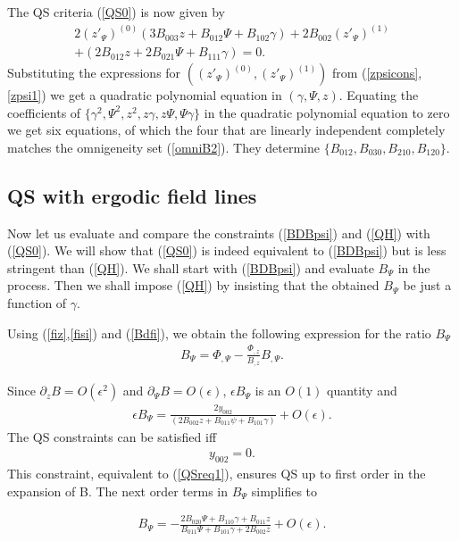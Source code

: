 \documentclass[aip,pop,reprint]{revtex4-1}
\newcommand*{\ep}{\epsilon}
\begin{document}
The QS criteria (\ref{QS0}) is now given by
\begin{align}
2(z'_\Psi)^{(0)}(3 B_{003}z+B_{012}\Psi + B_{102}\gamma)+2B_{002}(z'_\Psi)^{(1)}\nonumber\\
+(2 B_{012}z +2B_{021}\Psi +B_{111}\gamma)=0.
\end{align}
Substituting the expressions for $((z'_\Psi)^{(0)},(z'_\Psi)^{(1)})$ from (\ref{zpsicons},\ref{zpsi1}) we get a quadratic polynomial equation in $(\gamma,\Psi,z)$. Equating the coefficients of $\{\gamma^2,\Psi^2,z^2,z\gamma,z\Psi,\Psi\gamma\}$ in the quadratic polynomial equation to zero we get six equations, of which the four that are linearly independent completely matches the omnigeneity set (\ref{omniB2}). They determine $\{B_{012},B_{030},B_{210},B_{120}\}$.

\subsection{QS with ergodic field lines}
Now let us evaluate and compare the constraints (\ref{BDBpsi}) and (\ref{QH}) with (\ref{QS0}). We will show that (\ref{QS0}) is indeed equivalent to (\ref{BDBpsi}) but is less stringent than (\ref{QH}). We shall start with (\ref{BDBpsi}) and evaluate $B_\Psi$ in the process. Then we shall impose (\ref{QH}) by insisting that the obtained $B_\Psi$ be just a function of $\gamma$. 

Using (\ref{fiz},\ref{fisi}) and (\ref{Bdfi}), we obtain the following expression for the ratio $B_\Psi$
\begin{align}
B_\Psi= \Phi_{,\Psi}-\frac{\Phi_{,z}}{B_{,z}} B_{,\Psi}. \label{hdef}
\end{align}

Since $\partial_z B =O(\epsilon^2)$ and $\partial_\Psi B= O(\epsilon)$, $\ep B_\Psi$ is an $ O(1)$ quantity and 
\begin{align*}
\ep B_\Psi=\frac{2 y_{002}}{(2 B_{002} z+B_{011} \psi +B_{101} \gamma )}+O(\ep).
\end{align*}
The QS constraints can be satisfied iff  \begin{align*}
y_{002}=0 .
\end{align*}
This constraint, equivalent to (\ref{QSreq1}), ensures QS up to first order in the expansion of B. The next order terms in $B_\Psi$ simplifies to 

\begin{align}
B_\Psi=-\frac{2 B_{020}\Psi +B_{110}\gamma +B_{011}z}{B_{011}\Psi +B_{101}\gamma +2B_{002}z} +O(\ep).
\label{Bpsi0}
\end{align}
\end{document}
